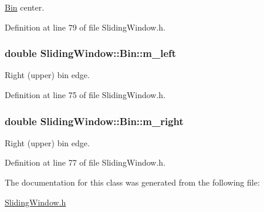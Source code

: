 \hyperlink{classSlidingWindow_1_1Bin}{Bin} center. 



Definition at line 79 of file Sliding\+Window.\+h.

\subsubsection[{\texorpdfstring{m\+\_\+left}{m_left}}]{\setlength{\rightskip}{0pt plus 5cm}double Sliding\+Window\+::\+Bin\+::m\+\_\+left\hspace{0.3cm}{\ttfamily [private]}}\hypertarget{classSlidingWindow_1_1Bin_a46a807a48bdf12a4cf8b2ccadb7a5ac7}{}\label{classSlidingWindow_1_1Bin_a46a807a48bdf12a4cf8b2ccadb7a5ac7}


Right (upper) bin edge. 



Definition at line 75 of file Sliding\+Window.\+h.

\subsubsection[{\texorpdfstring{m\+\_\+right}{m_right}}]{\setlength{\rightskip}{0pt plus 5cm}double Sliding\+Window\+::\+Bin\+::m\+\_\+right\hspace{0.3cm}{\ttfamily [private]}}\hypertarget{classSlidingWindow_1_1Bin_acda727a7789040fde0f10ac1c0c79bab}{}\label{classSlidingWindow_1_1Bin_acda727a7789040fde0f10ac1c0c79bab}


Right (upper) bin edge. 



Definition at line 77 of file Sliding\+Window.\+h.



The documentation for this class was generated from the following file\+:\begin{DoxyCompactItemize}
\item 
\hyperlink{SlidingWindow_8h}{Sliding\+Window.\+h}\end{DoxyCompactItemize}
